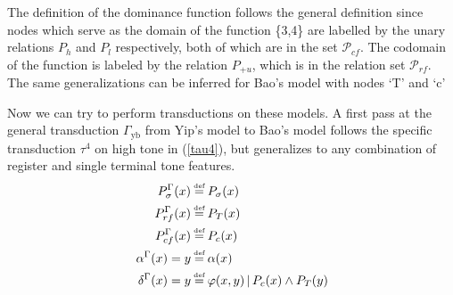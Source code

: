 \documentclass{article}
\newcommand\myeq{\mathrel{\stackrel{\makebox[0pt]{\mbox{\normalfont\tiny def}}}{=}}}
\begin{document}
The definition of the dominance function follows the general definition since nodes which serve as the domain of the function \{3,4\} are labelled by the unary relations $P_{h}$ and $P_{l}$ respectively, both of which are in the set $\mathcal{P}_{cf}$. The codomain of the function is labeled by the relation $P_{+u}$, which is in the relation set $\mathcal{P}_{rf}$. The same generalizations can be inferred for Bao's model with nodes `T' and `c'
\begin{center}
\hspace{2cm}
\end{center}
\par
Now we can try to perform transductions on these models. A first pass at the general transduction $\Gamma_{\text{yb}}$ from Yip's model to Bao's model follows the specific transduction $\tau^4$ on high tone in (\ref{tau4}), but generalizes to any combination of register and single terminal tone features.
\begin{equation}
\begin{split}
P^{\Gamma}_{\sigma}(x) &\myeq P_{\sigma}(x) \\
P^{\Gamma}_{rf}(x) &\myeq P_{T}(x) \\
P^{\Gamma}_{cf}(x) &\myeq P_{c}(x) \\
\alpha^{\Gamma}(x)=y &\myeq \alpha(x)\\
\delta^{\Gamma}(x)=y &\myeq \varphi(x,y)\,|\,P_{c}(x)\land P_{T}(y)
\end{split}
\end{equation}
\end{document}
